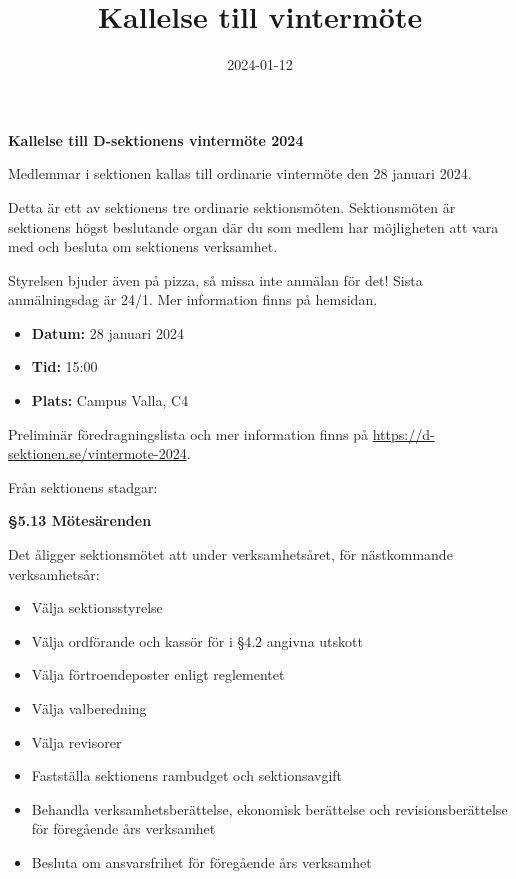 \documentclass{datateknologsektionen-document}
\title{Kallelse till vintermöte}
\date{2024-01-12}
\begin{document}





\large
\begin{center}
  \vspace*{5mm}
  {\LARGE\bfseries Kallelse till D-sektionens vintermöte 2024}
  \vspace{2mm}
\end{center}

Medlemmar i sektionen kallas till ordinarie vintermöte den 28 januari 2024. 

Detta är ett av sektionens tre ordinarie sektionsmöten. Sektionsmöten är sektionens högst beslutande organ där du som medlem har möjligheten att vara med och besluta om sektionens verksamhet. 

Styrelsen bjuder även på pizza, så missa inte anmälan för det! Sista anmälningsdag är 24/1. Mer information finns på hemsidan.

\vspace*{4mm}
\begin{itemize}
  \item \textbf{Datum:} 28 januari 2024
  \item \textbf{Tid:} 15:00
  \item \textbf{Plats:} Campus Valla, C4
  \vspace*{4mm}
\end{itemize}

Preliminär föredragningslista och mer information finns på \url{https://d-sektionen.se/vintermote-2024}.


Från sektionens stadgar:

\textbf{§5.13 Mötesärenden}

Det åligger sektionsmötet att under verksamhetsåret, för nästkommande verksamhetsår:
\begin{itemize}
  \item Välja sektionsstyrelse
  \item Välja ordförande och kassör för i §4.2 angivna utskott
  \item Välja förtroendeposter enligt reglementet
  \item Välja valberedning
  \item Välja revisorer
  \item Fastställa sektionens rambudget och sektionsavgift
  \item Behandla verksamhetsberättelse, ekonomisk berättelse och revisionsberättelse för föregående års verksamhet
\item Besluta om ansvarsfrihet för föregående års verksamhet
\end{itemize}
\end{document}
